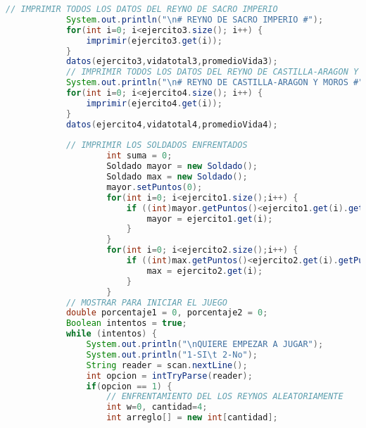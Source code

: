 \documentclass{article}
\begin{document}
\begin{itemize}
\begin{itemize}
\begin{lstlisting}[language=java]
			// IMPRIMIR TODOS LOS DATOS DEL REYNO DE SACRO IMPERIO
			System.out.println("\n# REYNO DE SACRO IMPERIO #");
			for(int i=0; i<ejercito3.size(); i++) {
				imprimir(ejercito3.get(i));
			}
			datos(ejercito3,vidatotal3,promedioVida3);
			// IMPRIMIR TODOS LOS DATOS DEL REYNO DE CASTILLA-ARAGON Y MOROS
			System.out.println("\n# REYNO DE CASTILLA-ARAGON Y MOROS #");
			for(int i=0; i<ejercito4.size(); i++) {
				imprimir(ejercito4.get(i));
			}
			datos(ejercito4,vidatotal4,promedioVida4);
			
			// IMPRIMIR LOS SOLDADOS ENFRENTADOS
					int suma = 0;
					Soldado mayor = new Soldado();
					Soldado max = new Soldado();
					mayor.setPuntos(0);
					for(int i=0; i<ejercito1.size();i++) {
						if ((int)mayor.getPuntos()<ejercito1.get(i).getPuntos()) {
							mayor = ejercito1.get(i);
						}
					}
					for(int i=0; i<ejercito2.size();i++) {
						if ((int)max.getPuntos()<ejercito2.get(i).getPuntos()) {
							max = ejercito2.get(i);
						}
					}
			// MOSTRAR PARA INICIAR EL JUEGO
			double porcentaje1 = 0, porcentaje2 = 0;
			Boolean intentos = true;
			while (intentos) {
				System.out.println("\nQUIERE EMPEZAR A JUGAR");
				System.out.println("1-SI\t 2-No");
				String reader = scan.nextLine();
				int opcion = intTryParse(reader);
				if(opcion == 1) {
					// ENFRENTAMIENTO DEL LOS REYNOS ALEATORIAMENTE
					int w=0, cantidad=4;
					int arreglo[] = new int[cantidad];
							

\end{lstlisting}
\end{itemize}
\end{itemize}
\end{document}
